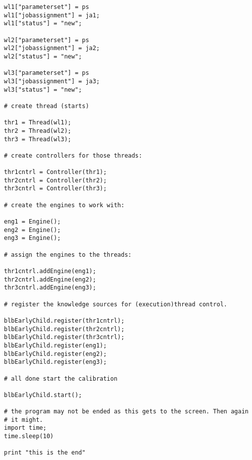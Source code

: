 \documentclass[]{lofar}
\begin{document}
\begin{Verbatim}[]
wl1["parameterset"] = ps
wl1["jobassignment"] = ja1;
wl1["status"] = "new";

wl2["parameterset"] = ps 
wl2["jobassignment"] = ja2;
wl2["status"] = "new";

wl3["parameterset"] = ps 
wl3["jobassignment"] = ja3;
wl3["status"] = "new";

# create thread (starts)

thr1 = Thread(wl1);
thr2 = Thread(wl2);
thr3 = Thread(wl3);

# create controllers for those threads:

thr1cntrl = Controller(thr1);
thr2cntrl = Controller(thr2);
thr3cntrl = Controller(thr3);

# create the engines to work with:

eng1 = Engine();
eng2 = Engine();
eng3 = Engine();

# assign the engines to the threads:

thr1cntrl.addEngine(eng1);
thr2cntrl.addEngine(eng2);
thr3cntrl.addEngine(eng3);

# register the knowledge sources for (execution)thread control.

blbEarlyChild.register(thr1cntrl);
blbEarlyChild.register(thr2cntrl);
blbEarlyChild.register(thr3cntrl);
blbEarlyChild.register(eng1);
blbEarlyChild.register(eng2);
blbEarlyChild.register(eng3);

# all done start the calibration

blbEarlyChild.start();

# the program may not be ended as this gets to the screen. Then again
# it might.
import time;
time.sleep(10)

print "this is the end"
\end{Verbatim}

  \label{stub-code}\hypertarget{stub-code}{}%
\end{document}
